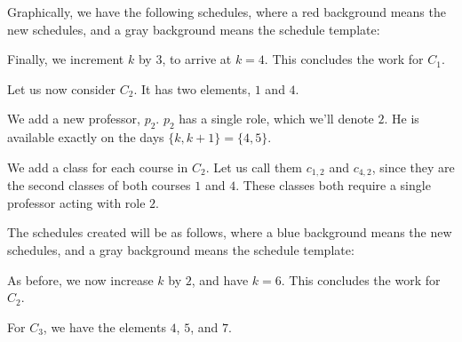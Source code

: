 Graphically, we have the following schedules, where a {\color{BrickRed}red} background means the new schedules, and a {\color{gray}gray} background means the schedule template:

\begin{center}
\end{center}

Finally, we increment $k$ by $3$, to arrive at $k = 4$. This concludes the work for {\color{BrickRed}$C_1$}.

Let us now consider {\color{NavyBlue}$C_2$}. It has two elements, $1$ and $4$.

We add a new professor, $p_2$. $p_2$ has a single role, which we'll denote $2$. He is available exactly on the days $\{k, k + 1\} = \{4, 5\}$.

We add a class for each course in {\color{NavyBlue}$C_2$}. Let us call them $c_{1, 2}$ and $c_{4, 2}$, since they are the second classes of both courses $1$ and $4$. These classes both require a single professor acting with role $2$.

The schedules created will be as follows, where a {\color{NavyBlue}blue} background means the new schedules, and a {\color{gray}gray} background means the schedule template:

\begin{center}
\end{center}

As before, we now increase $k$ by $2$, and have $k = 6$. This concludes the work for {\color{NavyBlue}$C_2$}.

For {\color{Fuchsia} $C_3$}, we have the elements $4$, $5$, and $7$. 

